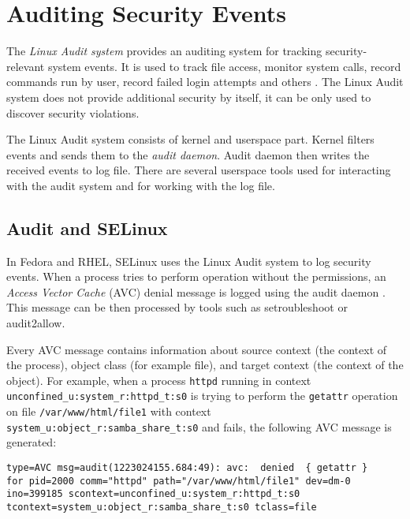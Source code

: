 \section{Auditing Security Events}

The \emph{Linux Audit system} provides an auditing system for tracking
security-relevant system events. It is used to track file access, monitor system
calls, record commands run by user, record failed login attempts and others
\cite{secguide}. The Linux Audit system does not provide additional security by
itself, it can be only used to discover security violations.

The Linux Audit system consists of kernel and userspace part. Kernel filters
events and sends them to the \emph{audit daemon}. Audit daemon then writes the
received events to log file. There are several userspace tools used for
interacting with the audit system and for working with the log file.

\subsection{Audit and SELinux}

In Fedora and RHEL, SELinux uses the Linux Audit system to log security events.
When a process tries to perform operation without the permissions, an
\emph{Access Vector Cache} (AVC) denial message is logged using the audit daemon
\cite{selinuxguide}. This message can be then processed by tools such as
setroubleshoot or audit2allow.

Every AVC message contains information about source context (the context of the
process), object class (for example file), and target context (the context of
the object). For example, when a process \texttt{httpd} running in context
\texttt{unconfined\_u:system\_r:httpd\_t:s0} is trying to perform the
\texttt{getattr} operation on file \texttt{/var/www/html/file1} with context
\texttt{system\_u:object\_r:samba\_share\_t:s0} and fails, the following AVC
message is generated:

\begin{lstlisting}
type=AVC msg=audit(1223024155.684:49): avc:  denied  { getattr }
for pid=2000 comm="httpd" path="/var/www/html/file1" dev=dm-0
ino=399185 scontext=unconfined_u:system_r:httpd_t:s0
tcontext=system_u:object_r:samba_share_t:s0 tclass=file
\end{lstlisting}

